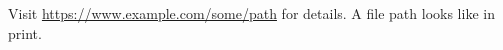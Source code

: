 \documentclass{article}
\begin{document}
Visit \url{https://www.example.com/some/path} for details.
A file path looks like  in print.
\end{document}
